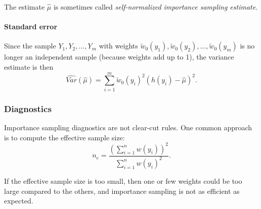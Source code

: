 \documentclass[useAMS,usenatbib]{biom}
\begin{document}
The estimate $\hat{\mu}$ is sometimes called
\textit{self-normalized importance sampling estimate}.

\paragraph{Standard error}
Since the sample $Y_1,Y_2,...,Y_m$ with weights
$\tilde{w}_0(y_1),\tilde{w}_0(y_2),...,\tilde{w}_0(y_m)$ is no longer
an independent sample (because weights add up to 1), the variance
estimate is then \citep{Owen2013}
\begin{equation}
\widehat{Var}(\hat{\mu}) = \sum_{i=1}^m \tilde{w}_0(y_i)^2(h(y_i)-\hat{\mu})^2.
\end{equation}

\subsubsection{Diagnostics}
Importance sampling diagnostics are not clear-cut rules. One common
approach is to compute the effective sample size:
\begin{equation}
n_e = \frac{\left( \sum_{i=1}^n w(y_i) \right)^2}{\sum_{i=1}^nw(y_i)^2}.
\end{equation}

If the effective sample size is too small, then one or few weights
could be too large compared to the others, and importance sampling is
not as efficient as expected.


\label{lastpage}
\end{document}
